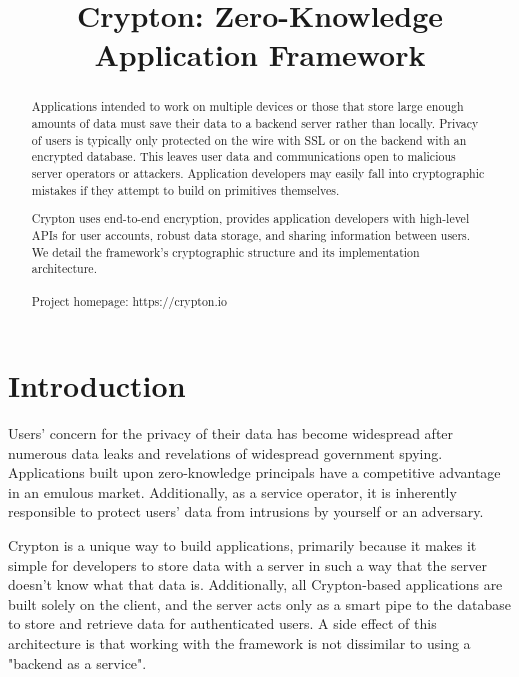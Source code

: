 \documentclass[conference]{IEEEtran}
\begin{document}
\title{Crypton: Zero-Knowledge Application Framework}

\author{
  \and
}

\maketitle

\begin{abstract}
Applications intended to work on multiple devices or those that
store large enough amounts of data must save their data to a backend server
rather than locally. Privacy of users is typically only protected on the wire
with SSL or on the backend with an encrypted database. This leaves user data
and communications open to malicious server operators or attackers.
Application developers may easily fall into cryptographic
mistakes if they attempt to build on primitives themselves.

Crypton uses end-to-end encryption, provides application developers
with high-level APIs for user accounts, robust data storage, and
sharing information between users. We detail the framework's cryptographic
structure and its implementation architecture.
\\
\\
Project homepage: https://crypton.io
\end{abstract}

\section{Introduction}
Users' concern for the privacy of their data has become widespread
after numerous data leaks and revelations of widespread government spying\cite{spying}.
Applications built upon zero-knowledge principals have a competitive
advantage in an emulous market. Additionally, as a service operator,
it is inherently responsible to protect users' data from intrusions
by yourself or an adversary.

Crypton is a unique way to build applications, primarily because it
makes it simple for developers to store data with a server in such a way
that the server doesn't know what that data is.
Additionally, all Crypton-based applications are built solely on the client,
and the server acts only as a smart pipe to the database to store and retrieve data
for authenticated users. A side effect of this architecture is that working with
the framework is not dissimilar to using a "backend as a service".
\end{document}

